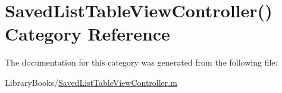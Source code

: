 \hypertarget{category_saved_list_table_view_controller_07_08}{}\section{Saved\+List\+Table\+View\+Controller() Category Reference}
\label{category_saved_list_table_view_controller_07_08}


The documentation for this category was generated from the following file\+:\begin{DoxyCompactItemize}
\item 
Library\+Books/\hyperlink{_saved_list_table_view_controller_8m}{Saved\+List\+Table\+View\+Controller.\+m}\end{DoxyCompactItemize}
